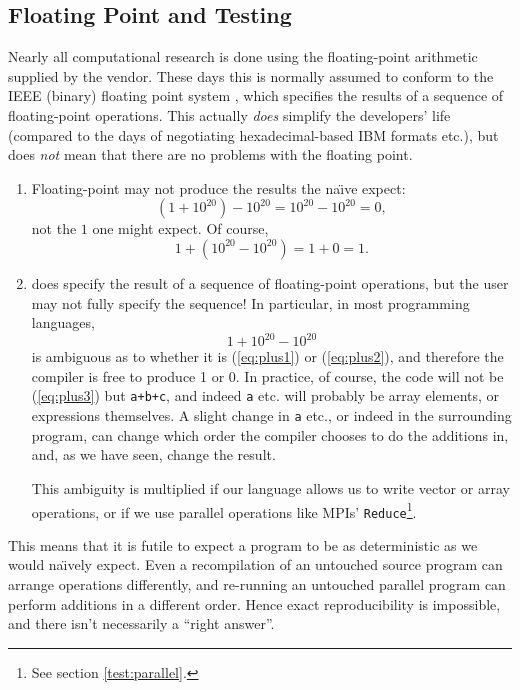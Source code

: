 \subsection{Floating Point and Testing}
Nearly all computational research is done using the floating-point arithmetic supplied by the vendor. These days this is normally assumed to conform to the IEEE (binary) floating point system \cite{IEEE2008}, which specifies the results of a sequence of floating-point operations. This actually \emph{does} simplify the developers' life (compared to the days of negotiating hexadecimal-based IBM formats etc.), but does \emph{not} mean that there are no problems with the floating point. 

\begin{enumerate}
\item Floating-point may not produce the results the na\"\i{}ve expect:
\begin{equation}\label{eq:plus1}
\left(1+10^{20}\right)-10^{20}=10^{20}-10^{20}=0,
\end{equation}
not the $1$ one might expect. Of course,
\begin{equation}\label{eq:plus2}
1+\left(10^{20}-10^{20}\right)=1+0=1.
\end{equation}
\item \cite{IEEE2008} does specify the result of a sequence of floating-point operations, but the user may not fully specify the sequence! In particular, in most programming languages, 
\begin{equation}\label{eq:plus3}
1+10^{20}-10^{20}
\end{equation}
is ambiguous as to whether it is (\ref{eq:plus1}) or  (\ref{eq:plus2}), and therefore the compiler is free to produce 1 or 0. In practice, of course, the code will not be (\ref{eq:plus3}) but \verb!a+b+c!, and indeed \verb!a! etc. will probably be array elements, or expressions themselves. A slight change in \verb!a! etc., or indeed in the surrounding program, can change which order the compiler chooses to do the additions in, and, as we have seen, change the result.
\par
This ambiguity is multiplied if our language allows us to write vector or array operations, or if we use parallel operations like MPIs' \verb+Reduce+\footnote{See section \ref{test:parallel}.}.
\end{enumerate}
This means that it is futile to expect a program to be as deterministic as we would na\"\i{}vely expect. Even a recompilation of an untouched source program can arrange operations differently, and re-running an untouched parallel program can perform additions in a different order. Hence exact reproducibility is impossible, and there isn't necessarily a ``right answer''.
